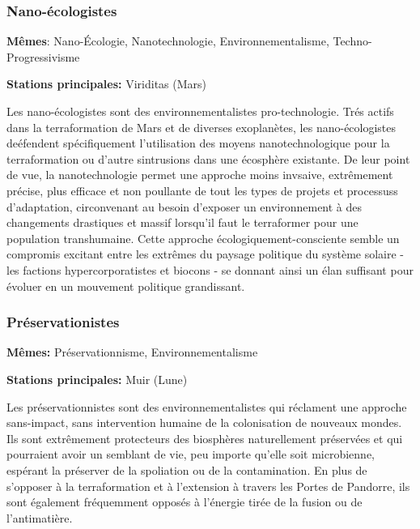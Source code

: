                                              \subsubsection{Nano-écologistes} \label{sec:nano-ecologists} 

                                             \textbf{Mêmes}: Nano-Écologie, Nanotechnologie, Environnementalisme, Techno-Progressivisme 

                                             \textbf{Stations principales:} Viriditas (Mars) 

                                             Les nano-écologistes sont des environnementalistes pro-technologie. Trés actifs dans la terraformation de Mars et de diverses exoplanètes, les nano-écologistes deéfendent spécifiquement l'utilisation des moyens nanotechnologique pour la terraformation ou d'autre sintrusions dans une écosphère existante. De leur point de vue, la nanotechnologie permet une approche moins invsaive, extrêmement précise, plus efficace et non poullante de tout les types de projets et processuss d'adaptation, circonvenant au besoin d'exposer un environnement à des changements drastiques et massif lorsqu'il faut le terraformer pour une population transhumaine. Cette approche écologiquement-consciente semble un compromis excitant entre les extrêmes du paysage politique du système solaire - les factions hypercorporatistes et biocons - se donnant ainsi un élan suffisant pour évoluer en un mouvement politique grandissant. 

                                             \subsubsection{Préservationistes} \label{sec:preservationists} 

                                             \textbf{Mêmes:} Préservationnisme, Environnementalisme 

                                             \textbf{Stations principales:} Muir (Lune) 

                                             Les préservationnistes sont des environnementalistes qui réclament une approche sans-impact, sans intervention humaine de la colonisation de nouveaux mondes. Ils sont extrêmement protecteurs des biosphères naturellement préservées et qui pourraient avoir un semblant de vie, peu importe qu'elle soit microbienne, espérant la préserver de la spoliation ou de la contamination. En plus de s'opposer à la terraformation et à l'extension à travers les Portes de Pandorre, ils sont également fréquemment opposés à l'énergie tirée de la fusion ou de l'antimatière. 

